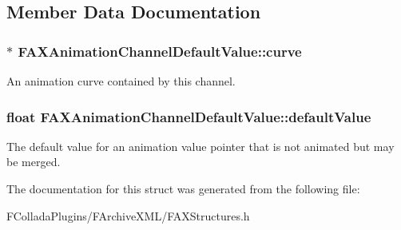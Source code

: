 \subsection{Member Data Documentation}
\hypertarget{structFAXAnimationChannelDefaultValue_aa2acbd5661a378862458fd0e392c8dec}{
\subsubsection[{curve}]{$\ast$ {\bf FAXAnimationChannelDefaultValue::curve}}}
\label{structFAXAnimationChannelDefaultValue_aa2acbd5661a378862458fd0e392c8dec}
An animation curve contained by this channel. \hypertarget{structFAXAnimationChannelDefaultValue_a03faf32f6146a54daa1902baf93edde4}{
\subsubsection[{defaultValue}]{\setlength{\rightskip}{0pt plus 5cm}float {\bf FAXAnimationChannelDefaultValue::defaultValue}}}
\label{structFAXAnimationChannelDefaultValue_a03faf32f6146a54daa1902baf93edde4}
The default value for an animation value pointer that is not animated but may be merged. 

The documentation for this struct was generated from the following file:\begin{DoxyCompactItemize}
\item 
FColladaPlugins/FArchiveXML/FAXStructures.h\end{DoxyCompactItemize}
